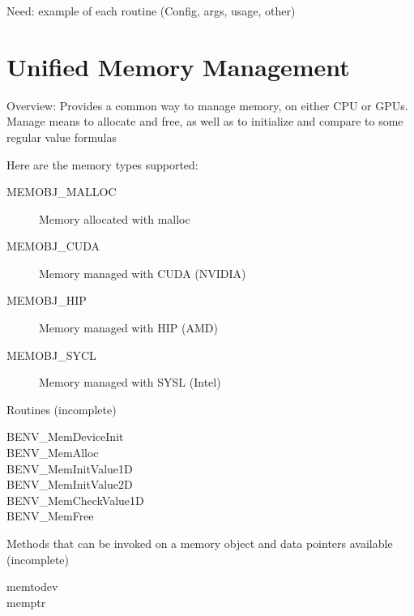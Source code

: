\documentclass[11pt,letterpaper]{report}
\begin{document}
Need: example of each routine (Config, args, usage, other)

\chapter{Unified Memory Management}
    Overview: Provides a common way to manage memory, on either CPU or GPUs.
    Manage means to allocate and free, as well as to initialize and compare
    to some regular value formulas

Here are the memory types supported:
\begin{description}
\item[MEMOBJ\_MALLOC]Memory allocated with malloc
\item[MEMOBJ\_CUDA]Memory managed with CUDA (NVIDIA)
\item[MEMOBJ\_HIP]Memory managed with HIP (AMD)
\item[MEMOBJ\_SYCL]Memory managed with SYSL (Intel)
\end{description}

Routines (incomplete)
\begin{description}
\item[BENV\_MemDeviceInit]
\item[BENV\_MemAlloc]
\item[BENV\_MemInitValue1D]
\item[BENV\_MemInitValue2D]
\item[BENV\_MemCheckValue1D]
\item[BENV\_MemFree]
\end{description}
Methods that can be invoked on a memory object and data pointers available (incomplete)
\begin{description}
\item[memtodev]
\item[memptr]
\end{description}
\end{document}
